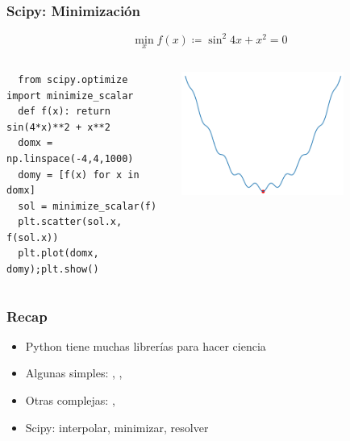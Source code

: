 \documentclass[14pt,aspectratio=169,xcolor=dvipsnames]{beamer}
\begin{document}
\begin{frame}[t,fragile]\frametitle{Scipy: Minimización}
    \begin{small}
    $$ \min_ x f(x) \coloneqq \sin^2 4x + x^2  = 0  $$
    \vspace{-0.5cm}
    \begin{columns}
        \begin{column}{0.49\textwidth}
    \begin{verbatim}  
  from scipy.optimize import minimize_scalar 
  def f(x): return sin(4*x)**2 + x**2
  domx = np.linspace(-4,4,1000)
  domy = [f(x) for x in domx]
  sol = minimize_scalar(f)
  plt.scatter(sol.x, f(sol.x))
  plt.plot(domx, domy);plt.show()
    \end{verbatim}
        \end{column}
        \begin{column}{0.5\textwidth}
            \begin{flushright}
                \includegraphics[width=0.7\textwidth]{../images/scipy-min.png}
            \end{flushright}
        \end{column}
    \end{columns}
    \end{small}
\end{frame}
\begin{frame}\frametitle{Recap}
    \begin{itemize}
        \item Python tiene muchas librerías para hacer ciencia
        \item Algunas simples: , , 
        \item Otras complejas: , 
        \item Scipy: interpolar, minimizar, resolver
    \end{itemize}
\end{frame}
\begin{frame}
    \maketitle
\end{frame}
\end{document}

